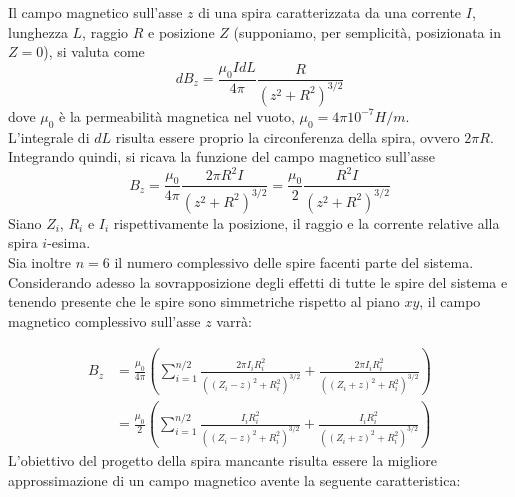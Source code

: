 \documentclass[a4paper, 11pt]{article}
\begin{document}
\noindent
Il campo magnetico sull’asse $z$  di una spira caratterizzata da una corrente
$I$, lunghezza $L$, raggio $R$ e posizione $Z$ (supponiamo, per
semplicità, posizionata in $Z=0$), si valuta come
\[dB_{z}=\frac{\mu_{0}IdL}{4\pi}\frac{R}{\left(z^{2}+R^{2}\right)^{3/2}}\]
dove $\mu_{0}$ è la permeabilità magnetica nel vuoto, $\mu_{0}=4{\pi}10^{-7}
H/m$. \\
L’integrale di $dL$ risulta essere proprio la circonferenza della spira, ovvero
$2{\pi}R$. Integrando quindi, si ricava la funzione del campo magnetico
sull'asse
\[B_{z}=\frac{\mu_{0}}{4\pi}\frac{2{\pi}R^{2}I}{\left(z^{2}+R^{2}\right)^{3/2}}=\frac{\mu_{0}}{2}\frac{R^{2}I}{\left(z^{2}+R^{2}\right)^{3/2}}\]
Siano $Z_{i}$, $R_{i}$ e $I_{i}$ rispettivamente la posizione, il raggio e la
corrente relative alla spira $i$-esima. \\
Sia inoltre $n=6$ il numero complessivo delle spire facenti parte del sistema.
Considerando adesso la sovrapposizione degli effetti di tutte le spire del
sistema e tenendo presente che le spire sono simmetriche rispetto al piano $xy$,
il campo magnetico complessivo sull’asse $z$ varrà:

\begin{align*}
	B_{z}
	&=\frac{\mu_{0}}{4{\pi}}\left(\sum_{i=1}^{n/2}\frac{2{\pi}I_{i}R_{i}^{2}}{\left(\left(Z_{i}-z\right)^{2}+R_{i}^{2}\right)^{3/2}}+\frac{2{\pi}I_{i}R_{i}^{2}}{\left(\left(Z_{i}+z\right)^{2}+R_{i}^{2}\right)^{3/2}}\right)\\
	&=\frac{\mu_{0}}{2}\left(\sum_{i=1}^{n/2}\frac{I_{i}R_{i}^{2}}{\left(\left(Z_{i}-z\right)^{2}+R_{i}^{2}\right)^{3/2}}+\frac{I_{i}R_{i}^{2}}{\left(\left(Z_{i}+z\right)^{2}+R_{i}^{2}\right)^{3/2}}\right)
\end{align*}
\noindent
L'obiettivo del progetto della spira mancante risulta essere la migliore
approssimazione di un campo magnetico avente la seguente caratteristica:
\end{document}
